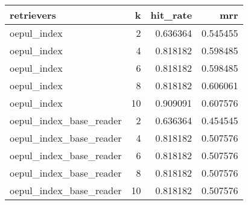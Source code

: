 \begin{tabular}{lrrr}
\toprule
retrievers & k & hit_rate & mrr \\
\midrule
oepul_index & 2 & 0.636364 & 0.545455 \\
oepul_index & 4 & 0.818182 & 0.598485 \\
oepul_index & 6 & 0.818182 & 0.598485 \\
oepul_index & 8 & 0.818182 & 0.606061 \\
oepul_index & 10 & 0.909091 & 0.607576 \\
oepul_index_base_reader & 2 & 0.636364 & 0.454545 \\
oepul_index_base_reader & 4 & 0.818182 & 0.507576 \\
oepul_index_base_reader & 6 & 0.818182 & 0.507576 \\
oepul_index_base_reader & 8 & 0.818182 & 0.507576 \\
oepul_index_base_reader & 10 & 0.818182 & 0.507576 \\
\bottomrule
\end{tabular}
